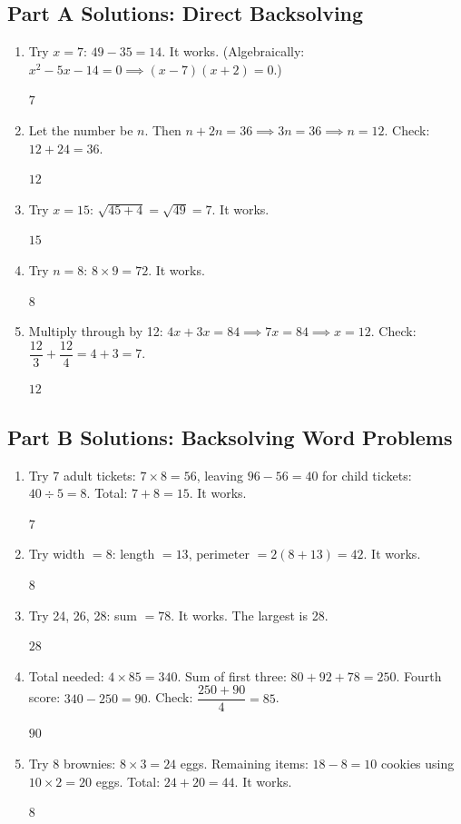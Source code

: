 \documentclass[14pt]{extarticle}
\begin{document}
\subsection*{Part A Solutions: Direct Backsolving}
\begin{enumerate}
  \item Try \(x = 7\): \(49 - 35 = 14\). It works. (Algebraically: \(x^2 - 5x - 14 = 0 \implies (x-7)(x+2) = 0\).)

  \(\boxed{7}\)

  \item Let the number be \(n\). Then \(n + 2n = 36 \implies 3n = 36 \implies n = 12\). Check: \(12 + 24 = 36\).

  \(\boxed{12}\)

  \item Try \(x = 15\): \(\sqrt{45 + 4} = \sqrt{49} = 7\). It works.

  \(\boxed{15}\)

  \item Try \(n = 8\): \(8 \times 9 = 72\). It works.

  \(\boxed{8}\)

  \item Multiply through by 12: \(4x + 3x = 84 \implies 7x = 84 \implies x = 12\). Check: \(\dfrac{12}{3} + \dfrac{12}{4} = 4 + 3 = 7\).

  \(\boxed{12}\)
\end{enumerate}

\subsection*{Part B Solutions: Backsolving Word Problems}
\begin{enumerate}
  \item Try 7 adult tickets: \(7 \times 8 = 56\), leaving \(96 - 56 = 40\) for child tickets: \(40 \div 5 = 8\). Total: \(7 + 8 = 15\). It works.

  \(\boxed{7}\)

  \item Try width \(= 8\): length \(= 13\), perimeter \(= 2(8 + 13) = 42\). It works.

  \(\boxed{8}\)

  \item Try 24, 26, 28: sum \(= 78\). It works. The largest is 28.

  \(\boxed{28}\)

  \item Total needed: \(4 \times 85 = 340\). Sum of first three: \(80 + 92 + 78 = 250\). Fourth score: \(340 - 250 = 90\). Check: \(\dfrac{250 + 90}{4} = 85\).

  \(\boxed{90}\)

  \item Try 8 brownies: \(8 \times 3 = 24\) eggs. Remaining items: \(18 - 8 = 10\) cookies using \(10 \times 2 = 20\) eggs. Total: \(24 + 20 = 44\). It works.

  \(\boxed{8}\)
\end{enumerate}
\end{document}
